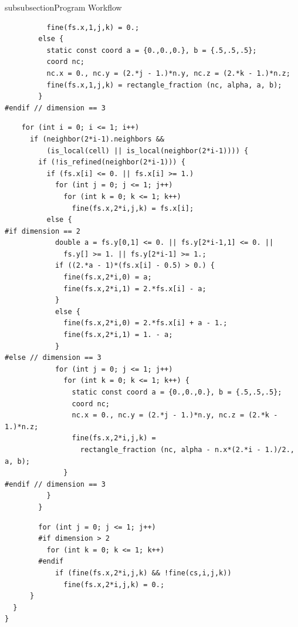 \begin{codesection}{subsubsection}{Program Workflow}
\begin{verbatim}
          fine(fs.x,1,j,k) = 0.;
        else {
          static const coord a = {0.,0.,0.}, b = {.5,.5,.5};
          coord nc;
          nc.x = 0., nc.y = (2.*j - 1.)*n.y, nc.z = (2.*k - 1.)*n.z;
          fine(fs.x,1,j,k) = rectangle_fraction (nc, alpha, a, b);
        }
#endif // dimension == 3
\end{verbatim}
\codearrow
{}
\begin{verbatim}
    for (int i = 0; i <= 1; i++)
      if (neighbor(2*i-1).neighbors &&
          (is_local(cell) || is_local(neighbor(2*i-1)))) {
        if (!is_refined(neighbor(2*i-1))) {
          if (fs.x[i] <= 0. || fs.x[i] >= 1.)
            for (int j = 0; j <= 1; j++)
              for (int k = 0; k <= 1; k++)
                fine(fs.x,2*i,j,k) = fs.x[i];
          else {
#if dimension == 2
            double a = fs.y[0,1] <= 0. || fs.y[2*i-1,1] <= 0. ||
              fs.y[] >= 1. || fs.y[2*i-1] >= 1.;
            if ((2.*a - 1)*(fs.x[i] - 0.5) > 0.) {
              fine(fs.x,2*i,0) = a;
              fine(fs.x,2*i,1) = 2.*fs.x[i] - a;
            }
            else {
              fine(fs.x,2*i,0) = 2.*fs.x[i] + a - 1.;
              fine(fs.x,2*i,1) = 1. - a;
            }
#else // dimension == 3
            for (int j = 0; j <= 1; j++)
              for (int k = 0; k <= 1; k++) {
                static const coord a = {0.,0.,0.}, b = {.5,.5,.5};
                coord nc;
                nc.x = 0., nc.y = (2.*j - 1.)*n.y, nc.z = (2.*k - 1.)*n.z;
                fine(fs.x,2*i,j,k) =
                  rectangle_fraction (nc, alpha - n.x*(2.*i - 1.)/2., a, b);
              }
#endif // dimension == 3
          }
        }
\end{verbatim}
\codearrow
{}
\begin{verbatim}
        for (int j = 0; j <= 1; j++)
        #if dimension > 2
          for (int k = 0; k <= 1; k++)
        #endif
            if (fine(fs.x,2*i,j,k) && !fine(cs,i,j,k))
              fine(fs.x,2*i,j,k) = 0.;
      }
  }
}
\end{verbatim}
\end{codesection}
\printbibliography

